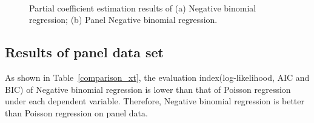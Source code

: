 \documentclass[entropy,article,submit,moreauthors,LaTeX and dvi2pdf]{Definitions/mdpi}
\begin{document}
\begin{paracol}{2}
\linenumbers
\switchcolumn

\end{paracol}
\begin{figure}[htbp]
	\widefigure
	\\
	\caption{Partial coefficient estimation results of (a) Negative binomial regression; (b) Panel Negative binomial regression.}
	\label{coef}
\end{figure}
\begin{paracol}{2}
\linenumbers
\switchcolumn
\subsection{Results of panel data set}
As shown in Table~\ref{comparison_xt}, the evaluation index(log-likelihood, AIC and BIC) of Negative binomial regression is lower than that of Poisson regression under each dependent variable. Therefore, Negative binomial regression is better than Poisson regression on panel data.
\end{paracol}
\end{document}
